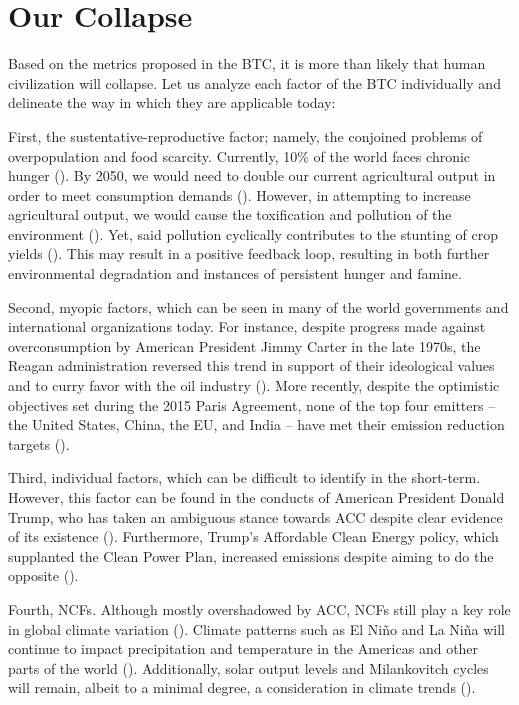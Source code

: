 \section{Our Collapse}

Based on the metrics proposed in the BTC, it is more than likely that human civilization will collapse. Let us analyze each factor of the BTC individually and delineate the way in which they are applicable today: 

First, the sustentative-reproductive factor; namely, the conjoined problems of overpopulation and food scarcity. Currently, 10\% of the world faces chronic hunger (\cite{omer2024hunger}). By 2050, we would need to double our current agricultural output in order to meet consumption demands (\cite{ranganathan2018feed10billion}). However, in attempting to increase agricultural output, we would cause the toxification and pollution of the environment (\cite[p.\ 3]{chowdhury2022agricultural}). Yet, said pollution cyclically contributes to the stunting of crop yields (\cite{jordan2022pollution}). This may result in a positive feedback loop, resulting in both further environmental degradation and instances of persistent hunger and famine. 

Second, myopic factors, which can be seen in many of the world governments and international organizations today. For instance, despite progress made against overconsumption by American President Jimmy Carter in the late 1970s, the Reagan administration reversed this trend in support of their ideological values and to curry favor with the oil industry (\cite{mckibben2021they}). More recently, despite the optimistic objectives set during the 2015 Paris Agreement, none of the top four emitters – the United States, China, the EU, and India – have met their emission reduction targets (\cite{bearak2022world}). 

Third, individual factors, which can be difficult to identify in the short-term. However, this factor can be found in the conducts of American President Donald Trump, who has taken an ambiguous stance towards ACC despite clear evidence of its existence (\cite{cheung2020trump}). Furthermore, Trump’s Affordable Clean Energy policy, which supplanted the Clean Power Plan, increased emissions despite aiming to do the opposite (\cite[p.\ 9]{keyes2019ace}). 

Fourth, NCFs. Although mostly overshadowed by ACC, NCFs still play a key role in global climate variation (\cite{shaftel2023vitalsigns}). Climate patterns such as El Niño and La Niña will continue to impact precipitation and temperature in the Americas and other parts of the world (\cite{halpert2014elnino}). Additionally, solar output levels and Milankovitch cycles will remain, albeit to a minimal degree, a consideration in climate trends (\cites{nasa2019sunrole}{nasa2020milankovitch}). 

